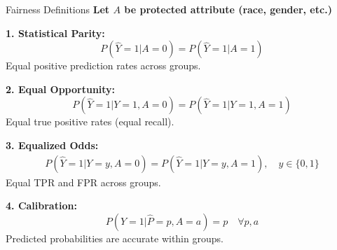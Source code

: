 \documentclass[aspectratio=169]{beamer}
\begin{document}
\begin{frame}{Fairness Definitions}
  \textbf{Let $A$ be protected attribute (race, gender, etc.)}

  \vspace{0.5em}

  \textbf{1. Statistical Parity:}
  \begin{equation}
    P(\hat{Y} = 1 | A = 0) = P(\hat{Y} = 1 | A = 1)
  \end{equation}
  Equal positive prediction rates across groups.

  \vspace{0.3em}

  \textbf{2. Equal Opportunity:}
  \begin{equation}
    P(\hat{Y} = 1 | Y = 1, A = 0) = P(\hat{Y} = 1 | Y = 1, A = 1)
  \end{equation}
  Equal true positive rates (equal recall).

  \vspace{0.3em}

  \textbf{3. Equalized Odds:}
  \begin{align}
    P(\hat{Y} = 1 | Y = y, A = 0) = P(\hat{Y} = 1 | Y = y, A = 1), \quad y \in \{0,1\}
  \end{align}
  Equal TPR and FPR across groups.

  \vspace{0.3em}

  \textbf{4. Calibration:}
  \begin{equation}
    P(Y = 1 | \hat{P} = p, A = a) = p \quad \forall p, a
  \end{equation}
  Predicted probabilities are accurate within groups.
\end{frame}
\end{document}
